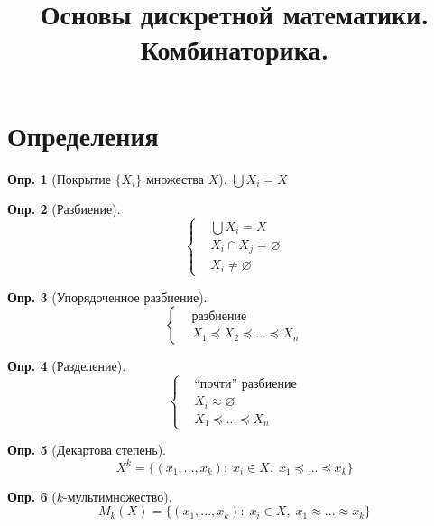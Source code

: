\documentclass[a4paper,12pt]{article}
\title{Основы дискретной математики.\\Комбинаторика.}
\author{}
\date{}
\numberwithin{figure}{section}
\theoremstyle{definition}
\newtheorem{definition}{Опр.}[section]
\theoremstyle{definition}
\begin{document}
\maketitle

\tableofcontents



\section{Определения}


\begin{definition}[Покрытие $\{X_i\}$ множества $X$]
	$\bigcup{X_i} = X$
\end{definition}

\begin{definition}[Разбиение]
	\[\begin{cases}
		& \bigcup{X_i} = X \\
		& X_i \cap X_j = \varnothing \\
		& X_i \ne \varnothing
	\end{cases}\]
\end{definition}

\begin{definition}[Упорядоченное разбиение]  \label{def.ord.break}
	\[\begin{cases}
		& \text{разбиение} \\
		& X_1 \preccurlyeq X_2 \preccurlyeq ... \preccurlyeq X_n
	\end{cases}\]
\end{definition}

\begin{definition}[Разделение]  \label{def.division}
	\[ \begin{cases}
		& \text{``почти'' разбиение} \\
		& X_i \approx \varnothing \\
		& X_1 \preccurlyeq ... \preccurlyeq X_n
	\end{cases} \]
\end{definition}

\begin{definition}[Декартова степень]
	\[ X^k = \{(x_1,...,x_k): \; x_i \in X, \; x_1 \preccurlyeq ... \preccurlyeq x_k \} \]
\end{definition}

\begin{definition}[$k$-мультимножество]
	\[ M_k(X) = \{(x_1,...,x_k): \; x_i \in X, \; x_1 \approx ... \approx x_k \} \]
\end{definition}
\end{document}
